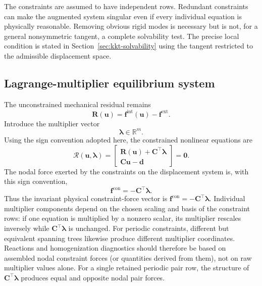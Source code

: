 \documentclass[11pt,a4paper]{article}
\newcommand{\vct}[1]{\mathbf{#1}}
\begin{document}
The constraints are assumed to have independent rows. Redundant constraints can make the augmented system singular even if every individual equation is physically reasonable. Removing obvious rigid modes is necessary but is not, for a general nonsymmetric tangent, a complete solvability test. The precise local condition is stated in Section~\ref{sec:kkt-solvability} using the tangent restricted to the admissible displacement space.

\subsection{Lagrange-multiplier equilibrium system}

The unconstrained mechanical residual remains
\begin{equation}
\vct{R}(\vct u)
=
\vct f^{\mathrm{int}}(\vct u)
-
\vct f^{\mathrm{ext}}.
\label{eq:global-residual}
\end{equation}
Introduce the multiplier vector
\begin{equation}
\vct\lambda\in\mathbb{R}^{m}.
\end{equation}
Using the sign convention adopted here, the constrained nonlinear equations are
\begin{equation}
\boxed{
\mathcal{R}(\vct u,\vct\lambda)
=
\begin{bmatrix}
\vct R(\vct u)+\vct C^\top\vct\lambda\\[1mm]
\vct C\vct u-\vct d
\end{bmatrix}
=
\vct0.
}
\label{eq:kkt-residual}
\end{equation}
The nodal force exerted by the constraints on the displacement system is, with this sign convention,
\begin{equation}
\vct f^{\mathrm{con}}=-\vct C^\top\vct\lambda.
\end{equation}
Thus the invariant physical constraint-force vector is $\vct f^{\mathrm{con}}=-\vct C^\top\vct\lambda$. Individual multiplier components depend on the chosen scaling and basis of the constraint rows: if one equation is multiplied by a nonzero scalar, its multiplier rescales inversely while $\vct C^\top\vct\lambda$ is unchanged. For periodic constraints, different but equivalent spanning trees likewise produce different multiplier coordinates. Reactions and homogenization diagnostics should therefore be based on assembled nodal constraint forces (or quantities derived from them), not on raw multiplier values alone. For a single retained periodic pair row, the structure of $\vct C^\top\vct\lambda$ produces equal and opposite nodal pair forces.
\end{document}
